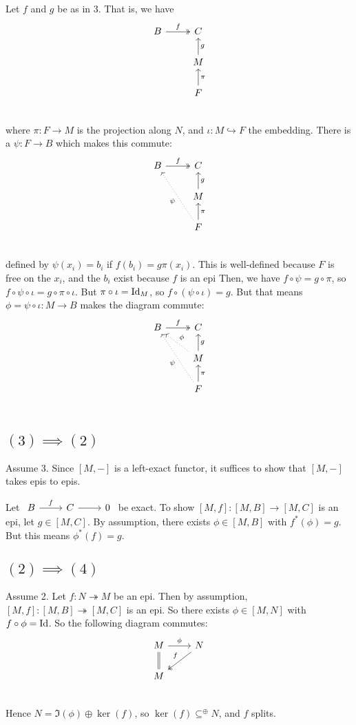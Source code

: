 \documentclass[x11names,reqno,14pt]{extarticle}
\newcommand{\onto}{\twoheadrightarrow}
\begin{document}
Let $f$ and $g$ be as in 3. That is, we have
\[
\begin{tikzcd}
B\ar[r, twoheadrightarrow, "f"] & C\\
& M\ar[u, "g"'] \\
& F\ar[u, "\pi"']\\
\end{tikzcd}
\]
where $\pi:F\to M$ is the projection along $N$, and $\iota:M\hookrightarrow F$ the embedding. There is a $\psi:F\to B$ which makes this commute: \[
\begin{tikzcd}
B\ar[r, twoheadrightarrow, "f"] & C\\
& M\ar[u, "g"'] \\
& F\ar[u, "\pi"']\ar[uul, dotted, "\psi"]\\
\end{tikzcd}
\]
defined by $\psi(x_i) = b_i$ if $f(b_i) = g\pi(x_i)$. This is well-defined because $F$ is free on the $x_i$, and the $b_i$ exist because $f$ is an epi Then, we have $f\circ\psi = g\circ\pi$, so $f\circ\psi\circ\iota = g\circ\pi\circ\iota$. But $\pi\circ\iota=\operatorname{\mathrm{Id}}_M$, so $f\circ(\psi\circ\iota) = g$. But that means $\phi = \psi\circ\iota:M\to B$ makes the diagram commute: \[
\begin{tikzcd}
B\ar[r, twoheadrightarrow, "f"] & C\\
& M\ar[u, "g"'] \ar[ul, dotted, "\phi"']\\
& F\ar[u, "\pi"']\ar[uul, dotted, "\psi"]\\
\end{tikzcd}
\]

\subsection*{$(3)\implies(2)$}

Assume 3. Since $[M,-]$ is a left-exact functor, it suffices to show that $[M,-]$ takes epis to epis. 

Let $\begin{tikzcd} B\ar[r, "f"] & C\ar[r]&0\end{tikzcd}$ be exact. To show $[M, f]:[M, B]\to[M, C]$ is an epi, let $g \in [M, C]$. By assumption, there exists $\phi\in[M, B]$ with $f^*(\phi)=g$. But this means $\phi^*(f) = g$. 

\subsection*{$(2)\implies(4)$}

Assume 2. Let $f:N\twoheadrightarrow M$ be an epi. Then by assumption, $[M, f]:[M, B]\onto[M,C]$ is an epi. So there exists $\phi\in[M,N]$ with $f\circ\phi=\operatorname{\mathrm{Id}}$. So the following diagram commutes:
\[
\begin{tikzcd}
M\ar[r, "\phi"]\ar[d, equals] & N \ar[dl, twoheadrightarrow, "f"'] \\
M & \\
\end{tikzcd}
\]
Hence $N = \Im(\phi)\oplus\ker(f)$, so $\ker(f)\subseteq^\oplus N$, and $f$ splits. 
\end{document}
